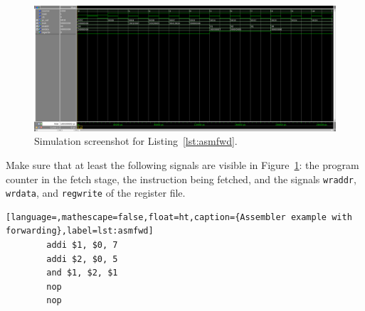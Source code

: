 
\begin{figure}[ht!]
  \centering
  \framebox[\linewidth]{
  }
  \includegraphics[width=1.0\linewidth]{task1.png}
  \caption{Simulation screenshot for Listing~\ref{lst:asmfwd}.}
  \label{fig:sim1}
\end{figure}

Make sure that at least the following signals are visible in
Figure~\ref{fig:sim1}: the program counter in the fetch stage, the
instruction being fetched, and the signals \texttt{wraddr},
\texttt{wrdata}, and \texttt{regwrite} of the register file.

\begin{lstlisting}[language=,mathescape=false,float=ht,caption={Assembler example with forwarding},label=lst:asmfwd]
        addi $1, $0, 7
        addi $2, $0, 5
        and $1, $2, $1
        nop
        nop
\end{lstlisting}
